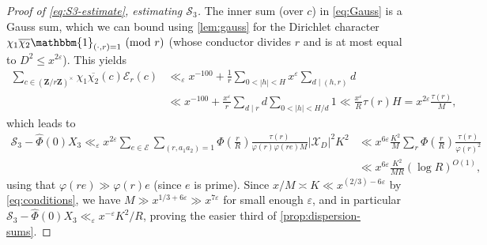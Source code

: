 \documentclass[reqno,11pt]{amsart}
\theoremstyle{definition}
\theoremstyle{remark}
\numberwithin{equation}{section}
\newcommand{\Z}{\mathbf{Z}}
\newcommand{\msE}{\mathscr{E}}
\newcommand{\mE}{\mathcal{E}}
\newcommand{\mS}{\mathcal{S}}
\newcommand{\mX}{\mathcal{X}}
\newcommand{\one}{\mathbbm{1}}
\newcommand{\eps}{\varepsilon}
\renewcommand{\bar}{\overline}
\renewcommand{\hat}{\widehat}
\renewcommand{\pmod}[1]{\ (\textnormal{mod } #1)}
\begin{document}
\begin{proof}[Proof of \cref{eq:S3-estimate}, estimating $\mS_3$]
The inner sum (over $c$) in \cref{eq:Gauss} is a Gauss sum, which we can bound using \cref{lem:gauss} for the Dirichlet character $\chi_1 \bar{\chi_2} \one_{(\cdot, r) = 1} \pmod{r}$ (whose conductor divides $r$ and is at most equal to $D^2 \le x^{2\eps}$). This yields
\[
\begin{aligned}
    \sum_{c \in (\Z/r\Z)^\times} \chi_1 \bar{\chi_2}(c) \mE_r(c) 
    &\ll_\eps x^{-100} +
    \frac{1}{r} \sum_{0 < |h| < H} x^\eps \sum_{d \mid (h, r)} d
    \\
    &\ll x^{-100} +
    \frac{x^\eps}{r} \sum_{d \mid r} d \sum_{0 < |h| < H/d} 1
    \ll
    \frac{x^{\eps}}{R} \tau(r) H
    =
    x^{2\eps} \frac{\tau(r)}{M},
\end{aligned}
\]
which leads to
\[
\begin{aligned}
    \mS_3 - \hat{\Phi}(0) X_3
    \ll_\eps 
    x^{2\eps}
    \sum_{e \in \msE}
    \sum_{(r,a_1a_2)=1} 
    \Phi\left(\frac{r}{R}\right)
    \frac{\tau(r)}{\varphi(r)\varphi(re) M} 
 |\mX_D|^2 K^2
    &\ll 
    x^{6\eps} \frac{K^2}{M}
    \sum_{r} \Phi\left(\frac{r}{R}\right)
    \frac{\tau(r)}{\varphi(r)^2} 
    \\
    &\ll 
    x^{6\eps} \frac{K^2}{MR} (\log R)^{O(1)},
\end{aligned}
\]
using that $\varphi(re) \gg \varphi(r) e$ (since $e$ is prime). Since $x/M \asymp K \ll x^{(2/3)-6\eps}$ by \cref{eq:conditions}, we have $M \gg x^{1/3+6\eps} \gg x^{7\eps}$ for small enough $\eps$, and in particular $\mS_3 - \hat{\Phi}(0)X_3\ll_\eps x^{-\eps} K^2/R$, proving the easier third of \cref{prop:dispersion-sums}.
\end{proof}
\end{document}
